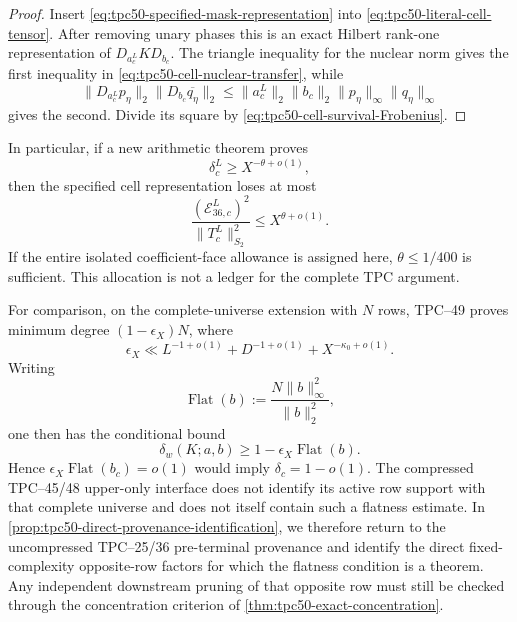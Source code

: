 \begin{proof}
Insert \eqref{eq:tpc50-specified-mask-representation} into
\eqref{eq:tpc50-literal-cell-tensor}.  After removing unary phases this
is an exact Hilbert rank-one representation of
\(D_{a_c^L}KD_{b_c}\).  The triangle inequality for the nuclear norm
gives the first inequality in
\eqref{eq:tpc50-cell-nuclear-transfer}, while
\begin{equation}
 \|D_{a_c^L}p_\eta\|_2
 \|D_{b_c}\overline{q_\eta}\|_2
 \le
 \|a_c^L\|_2\|b_c\|_2
 \|p_\eta\|_\infty\|q_\eta\|_\infty
 \label{eq:tpc50-layer-supremum-transfer}
\end{equation}
gives the second.  Divide its square by
\eqref{eq:tpc50-cell-survival-Frobenius}.
\end{proof}

In particular, if a new arithmetic theorem proves
\begin{equation}
 \delta_c^L\ge X^{-\theta+o(1)},
 \label{eq:tpc50-cell-survival-target}
\end{equation}
then the specified cell representation loses at most
\begin{equation}
 \frac{(\mathcal E_{36,c}^L)^2}
      {\|T_c^L\|_{S_2}^2}
 \le X^{\theta+o(1)}.
 \label{eq:tpc50-cell-distortion-consequence}
\end{equation}
If the entire isolated coefficient-face allowance is assigned here,
\(\theta\le1/400\) is sufficient.  This allocation is not a ledger for
the complete TPC argument.

For comparison, on the complete-universe extension with \(N\) rows,
TPC--49 proves minimum degree \((1-\epsilon_X)N\), where
\begin{equation}
 \epsilon_X\ll
 L^{-1+o(1)}+D^{-1+o(1)}+X^{-\kappa_0+o(1)}.
 \label{eq:tpc50-complete-mask-defect}
\end{equation}
Writing
\begin{equation}
 \operatorname{Flat}(b):=
 \frac{N\|b\|_\infty^2}{\|b\|_2^2},
 \label{eq:tpc50-opposite-flatness}
\end{equation}
one then has the conditional bound
\begin{equation}
 \delta_w(K;a,b)
 \ge1-\epsilon_X\operatorname{Flat}(b).
 \label{eq:tpc50-degree-flatness-bound}
\end{equation}
Hence \(\epsilon_X\operatorname{Flat}(b_c)=o(1)\) would imply
\(\delta_c=1-o(1)\).  The compressed TPC--45/48 upper-only interface
does not identify its active row support with that complete universe
and does not itself contain such a flatness estimate.  In
\cref{prop:tpc50-direct-provenance-identification}, we therefore return
to the uncompressed TPC--25/36 pre-terminal provenance and identify the
direct fixed-complexity opposite-row factors for which the flatness
condition is a theorem.  Any independent downstream pruning of that
opposite row must still be checked through the concentration criterion
of \cref{thm:tpc50-exact-concentration}.

